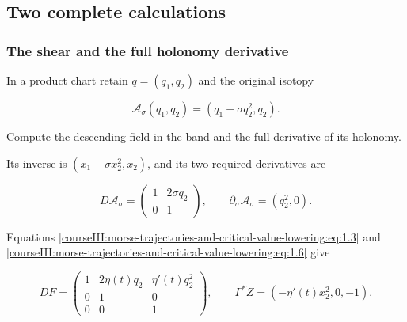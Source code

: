 \subsection{Two complete calculations}
\label{courseIII:morse-trajectories-and-critical-value-lowering:trajectory-lowering-exercises}

\label{courseIII:morse-trajectories-and-critical-value-lowering:section-6}

\subsubsection{The shear and the full holonomy derivative}
\label{courseIII:morse-trajectories-and-critical-value-lowering:section-6.1}

\label{courseIII:trajectory-lowering:6.1}

In a product chart retain \(q=(q_1,q_2)\) and the original isotopy

\begin{equation}
\mathcal A_\sigma(q_1,q_2)
 =(q_1+\sigma q_2^2,q_2).
 \label{courseIII:morse-trajectories-and-critical-value-lowering:eq:6.1}
\end{equation}

Compute the descending field in the band and the full derivative of its holonomy.

Its inverse is \((x_1-\sigma x_2^2,x_2)\), and its two required derivatives are

\begin{equation}
D\mathcal A_\sigma=
 \begin{pmatrix}1&2\sigma q_2\\0&1\end{pmatrix},
 \qquad
 \partial_\sigma\mathcal A_\sigma=(q_2^2,0).
 \label{courseIII:morse-trajectories-and-critical-value-lowering:eq:6.2}
\end{equation}

Equations \eqref{courseIII:morse-trajectories-and-critical-value-lowering:eq:1.3} and \eqref{courseIII:morse-trajectories-and-critical-value-lowering:eq:1.6} give

\begin{equation}
DF=
 \begin{pmatrix}
 1&2\eta(t)q_2&\eta'(t)q_2^2\\
 0&1&0\\
 0&0&1
 \end{pmatrix},
 \qquad
 \Gamma^*\widetilde Z=(-\eta'(t)x_2^2,0,-1).
 \label{courseIII:morse-trajectories-and-critical-value-lowering:eq:6.3}
\end{equation}

